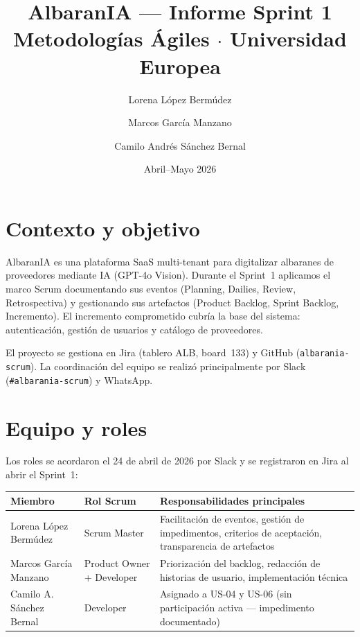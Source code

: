 \documentclass[11pt,a4paper]{article}
\title{\textbf{AlbaranIA} --- Informe Sprint 1 \\
\large Metodologías Ágiles $\cdot$ Universidad Europea}
\author{Lorena López Bermúdez \and Marcos García Manzano \and Camilo Andrés Sánchez Bernal}
\date{Abril--Mayo 2026}
\begin{document}
\maketitle

\section{Contexto y objetivo}

AlbaranIA es una plataforma SaaS multi-tenant para digitalizar albaranes
de proveedores mediante IA (GPT-4o Vision). Durante el Sprint~1 aplicamos
el marco Scrum documentando sus eventos (Planning, Dailies, Review,
Retrospectiva) y gestionando sus artefactos (Product Backlog, Sprint
Backlog, Incremento). El incremento comprometido cubría la base del
sistema: autenticación, gestión de usuarios y catálogo de proveedores.

El proyecto se gestiona en Jira (tablero ALB, board~133) y GitHub
(\texttt{albarania-scrum}). La coordinación del equipo se realizó
principalmente por Slack (\texttt{\#albarania-scrum}) y WhatsApp.

\section{Equipo y roles}

Los roles se acordaron el 24 de abril de 2026 por Slack y se registraron
en Jira al abrir el Sprint~1:

\begin{center}
\begin{tabular}{llp{7cm}}
\toprule
\textbf{Miembro} & \textbf{Rol Scrum} & \textbf{Responsabilidades principales} \\
\midrule
Lorena López Bermúdez & Scrum Master &
  Facilitación de eventos, gestión de impedimentos, criterios de aceptación, transparencia de artefactos \\
Marcos García Manzano & Product Owner + Developer &
  Priorización del backlog, redacción de historias de usuario, implementación técnica \\
Camilo A. Sánchez Bernal & Developer &
  Asignado a US-04 y US-06 (sin participación activa --- impedimento documentado) \\
\bottomrule
\end{tabular}
\end{center}
\end{document}
